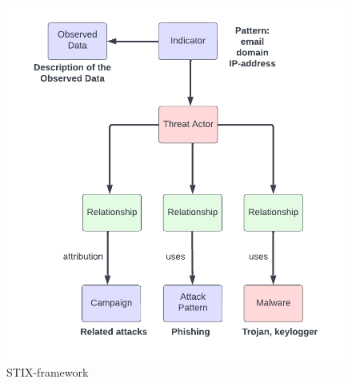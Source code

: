 \documentclass{article}
\begin{document}
		\begin{figure}[!htb]
			\centering
			\includegraphics[width=\linewidth]{stix.png}
			\caption{STIX-framework}
			\label{STIX-framework}
		\end{figure}
	
\end{document}

